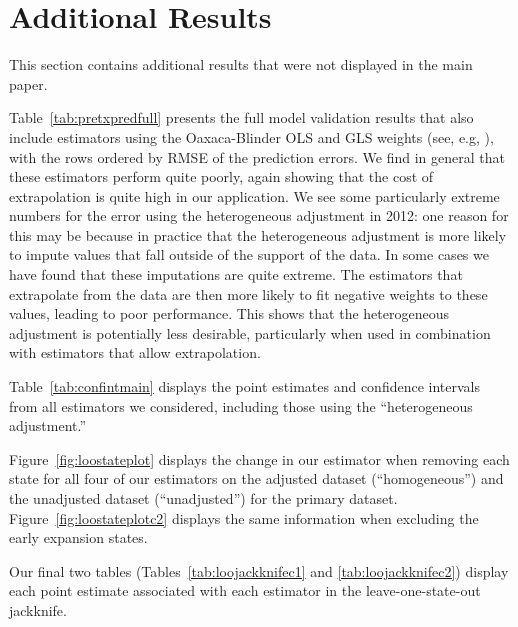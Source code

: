 \section{Additional Results}\label{app:allresults}

This section contains additional results that were not displayed in the main paper.

Table~\ref{tab:pretxpredfull} presents the full model validation results that also include estimators using the Oaxaca-Blinder OLS and GLS weights (see, e.g, \cite{kline2011oaxaca}), with the rows ordered by RMSE of the prediction errors. We find in general that these estimators perform quite poorly, again showing that the cost of extrapolation is quite high in our application. We see some particularly extreme numbers for the error using the heterogeneous adjustment in 2012: one reason for this may be because in practice that the heterogeneous adjustment is more likely to impute values that fall outside of the support of the data. In some cases we have found that these imputations are quite extreme. The estimators that extrapolate from the data are then more likely to fit negative weights to these values, leading to poor performance. This shows that the heterogeneous adjustment is potentially less desirable, particularly when used in combination with estimators that allow extrapolation.

Table~\ref{tab:confintmain} displays the point estimates and confidence intervals from all estimators we considered, including those using the ``heterogeneous adjustment.''

Figure~\ref{fig:loostateplot} displays the change in our estimator when removing each state for all four of our estimators on the adjusted dataset (``homogeneous'') and the unadjusted dataset (``unadjusted'') for the primary dataset. Figure~\ref{fig:loostateplotc2} displays the same information when excluding the early expansion states. 

Our final two tables (Tables~\ref{tab:loojackknifec1} and \ref{tab:loojackknifec2}) display each point estimate associated with each estimator in the leave-one-state-out jackknife.

